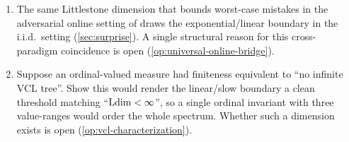 \begin{enumerate}[leftmargin=*,itemsep=3pt]
\item The same Littlestone dimension that bounds worst-case mistakes in the adversarial online setting of  draws the exponential/linear boundary in the i.i.d.\ setting (\cref{sec:surprise}). A single structural reason for this cross-paradigm coincidence is open (\cref{op:universal-online-bridge}).

\item Suppose an ordinal-valued measure had finiteness equivalent to ``no infinite VCL tree''. Show this would render the linear/slow boundary a clean threshold matching ``$\mathrm{Ldim} < \infty$'', so a single ordinal invariant with three value-ranges would order the whole spectrum. Whether such a dimension exists is open (\cref{op:vcl-characterization}).
\end{enumerate}
